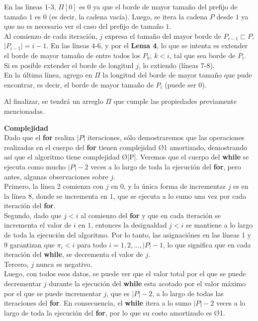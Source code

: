 En las líneas 1-3, $\Pi[0]$ es $0$ ya que el borde de mayor tamaño del prefijo de tamaño $1$ es $0$ (es decir, la cadena vacía). Luego, se itera la cadena $P$ desde $1$ ya que no es necesario ver el caso del prefijo de tamaño $1$.\\
Al comienzo de cada iteración, $j$ expresa el tamaño del mayor borde de $P_{i-1} \sqsubset P$, $|P_{i-1}| = i-1$.
En las líneas 4-6, y por el \textbf{Lema 4}, lo que se intenta es extender el borde de mayor tamaño de entre todos los $P_{k}$, $k < i$, tal que sea borde de $P_i$.\\
Si es posible extender el borde de longitud $j$, lo extiendo (líneas 7-8).\\
En la última línea, agrego en $\Pi$ la longitud del borde de mayor tamaño que pude encontrar, es decir, el borde de mayor tamaño de $P_i$ (puede ser $0$).

Al finalizar, se tendrá un arreglo $\Pi$ que cumple las propiedades previamente mencionadas.\\
\strut\hfill\qedsymbol

\textbf{Complejidad}\\
Dado que el \textbf{for} realiza $|P|$ iteraciones, sólo demostraremos que las operaciones realizadas en el cuerpo del \textbf{for} tienen complejidad \O{1} amortizado, demostrando así que el algoritmo tiene complejidad \O{|P|}.
Veremos que el cuerpo del \textbf{while} se ejecuta como mucho $|P|-2$ veces a lo largo de toda la ejecución del \textbf{for}, pero antes, algunas observaciones sobre $j$.\\
Primero, la línea 2 comienza con $j$ en $0$, y la única forma de incrementar $j$ es en la línea 8, donde se incrementa en $1$, que se ejecuta a lo sumo una vez por cada iteración del \textbf{for}.\\
Segundo, dado que $j < i$ al comienzo del \textbf{for} y que en cada iteración se incrementa el valor de $i$ en $1$, entonces la desigualdad $j < i$ se mantiene a lo largo de toda la ejecución del algoritmo. Por lo tanto, las asignaciónes en las líneas 1 y 9 garantizan que $\pi_i < i$ para todo $i = 1,2,...,|P|-1$, lo que significa que en cada iteración del \textbf{while}, se decrementa el valor de $j$.\\
Tercero, $j$ nunca es negativo.\\
Luego, con todos esos datos, se puede ver que el valor total por el que se puede decrementar $j$ durante la ejecución del \textbf{while} esta acotado por el valor máximo por el que se puede incrementar $j$, que es $|P|-2$, a lo largo de todas las iteraciones del \textbf{for}.
En consecuencia, el \textbf{while} itera a lo sumo $|P|-2$ veces a lo largo de toda la ejecución del \textbf{for}, por lo que su costo amortizado es \O{1}.

